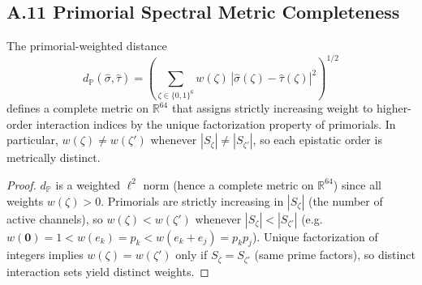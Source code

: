 \documentclass[11pt]{article}
\begin{document}
\subsection*{A.11 \quad Primorial Spectral Metric Completeness}

\begin{proposition}\label{prop:metric}
The primorial-weighted distance
\[
  d_{\mathbb{P}}(\hat{\sigma}, \hat{\tau})
  = \left(\sum_{\zeta \in \{0,1\}^6}
      w(\zeta)\,|\hat{\sigma}(\zeta) - \hat{\tau}(\zeta)|^2
    \right)^{1/2}
\]
defines a complete metric on $\mathbb{R}^{64}$ that assigns strictly
increasing weight to higher-order interaction indices by the unique
factorization property of primorials.  In particular,
$w(\zeta) \ne w(\zeta')$ whenever $|S_\zeta| \ne |S_{\zeta'}|$, so
each epistatic order is metrically distinct.
\end{proposition}

\begin{proof}
$d_{\mathbb{P}}$ is a weighted $\ell^2$ norm (hence a complete metric on
$\mathbb{R}^{64}$) since all weights $w(\zeta) > 0$.  Primorials are
strictly increasing in $|S_\zeta|$ (the number of active channels), so
$w(\zeta) < w(\zeta')$ whenever $|S_\zeta| < |S_{\zeta'}|$
(e.g.\ $w(\bm{0})=1 < w(e_k) = p_k < w(e_k + e_j) = p_k p_j$).
Unique factorization of integers implies $w(\zeta) = w(\zeta')$ only if
$S_\zeta = S_{\zeta'}$ (same prime factors), so distinct interaction
sets yield distinct weights.
\end{proof}
\nocite{*}
  

\end{document}
